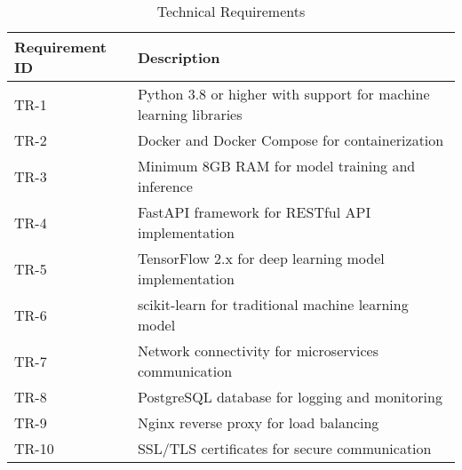 \documentclass[12pt,a4paper]{report}
\begin{document}
\begin{table}[H]
\caption{Technical Requirements}
\begin{tabularx}{\textwidth}{|>{\hspace{0.5em}}p{}|>{\hspace{0.5em}}X|}
\hline
\rowcolor{tableheadcolor}\textbf{Requirement ID} & \textbf{Description} \\
\hline
TR-1 & Python 3.8 or higher with support for machine learning libraries \\
\hline
TR-2 & Docker and Docker Compose for containerization \\
\hline
TR-3 & Minimum 8GB RAM for model training and inference \\
\hline
TR-4 & FastAPI framework for RESTful API implementation \\
\hline
TR-5 & TensorFlow 2.x for deep learning model implementation \\
\hline
TR-6 & scikit-learn for traditional machine learning model \\
\hline
TR-7 & Network connectivity for microservices communication \\
\hline
TR-8 & PostgreSQL database for logging and monitoring \\
\hline
TR-9 & Nginx reverse proxy for load balancing \\
\hline
TR-10 & SSL/TLS certificates for secure communication \\
\hline
\end{tabularx}
\end{table}
\end{document}
